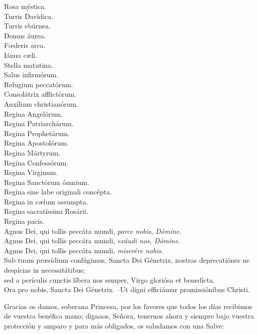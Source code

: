 \documentclass[./rosary.tex]{subfiles}
\begin{document}
\begin{multicols}{2}
    Rosa mýstica.\\
    Turris Davídica.\\
    Turris ebúrnea.\\
    Domus áurea.\\
    Fœderis arca.\\
    Iánua cæli.\\
    Stella matutina.\\
    Salus infirmórum.\\
    Refugium peccatórum.\\
    Consolátrix af­flic­tórum.\\
    Auxílium chris­tia­nórum.\\
    Regina Angelórum.\\
    Regina Pa­triar­chárum.\\
    Regina Pro­phe­tárum.\\
    Regina Apos­to­lórum.\\
    Regina Mártyrum.\\
    Regina Con­fe­ssórum.\\
    Regina Vírginum.\\
    Regina Sanctórum ómnium.\\
    Regina sine labe originali concépta.\\
    Regina in cælum assumpta.\\
    Regina sa­cra­tíssimi Rosárii.\\
    Regina pacis.\\
    Agnus Dei, qui tollis peccáta mundi, \emph{parce nobis, Dómine}.\\
    Agnus Dei, qui tollis peccáta mundi, \emph{exáudi nos, Dómine}.\\
    Agnus Dei, qui tollis peccáta mundi, \emph{miserére nobis}.\\
    Sub tuum præsídium confúgimus, Sancta Dei Génetrix, nostras de­pre­ca­tiónes ne despícias in ne­ces­si­tátibus;\\
    sed a perículis cunctis líbera nos semper, Virgo gloriósa et benedícta.\\
    Ora pro nobis, Sancta Dei Génetrix. --Ut digni efficiámur pro­mi­ssiónibus Christi.
\end{multicols}

Gracias os damos, soberana Princesa, por los favores que todos los días recibimos de vuestra benéfica mano; dignaos, Señora, tenernos ahora
y siempre bajo vuestra protección y amparo y para más obligados, os saludamos con una Salve:
\end{document}
